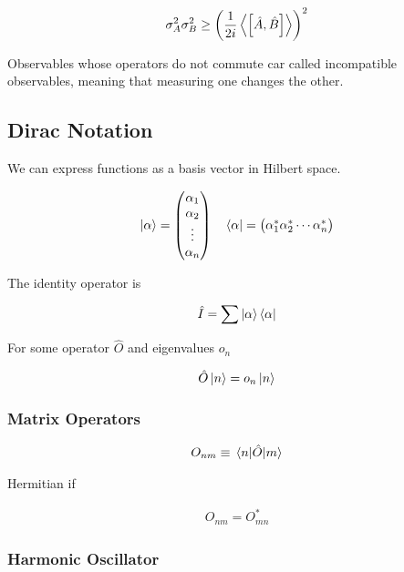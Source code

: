\documentclass[8pt]{amsart}
\begin{document}
\begin{multicols}{3}
\begin{align*}
  \sigma_A^2\sigma_B^2\geq {\left(\frac{1}{2i}\expval{\left[\hat{A},\hat{B}\right]}\right)}^2
\end{align*}

Observables whose operators do not commute car called incompatible observables,
meaning that measuring one changes the other.

\subsection{Dirac Notation}%
\label{sub:dirac_notation}

We can express functions as a basis vector in Hilbert space.

\begin{align*}
  \ket{\alpha}=\begin{pmatrix}
    \alpha_1\\
    \alpha_2\\
    \vdots \\
    \alpha_n
  \end{pmatrix}\quad
  \bra{\alpha}=\begin{pmatrix}
    \alpha_1^*  \alpha_2^*  \cdots  \alpha_n^*
  \end{pmatrix}
\end{align*}

The identity operator is

\begin{align*}
  \hat{I}=\sum\ket{\alpha}\bra{\alpha}
\end{align*}

For some operator $\hat{O}$ and eigenvalues $o_n$

\begin{align*}
  \hat{O}\ket{n}=o_n\ket{n}
\end{align*}

\subsubsection{Matrix Operators}%
\label{ssub:matrix_operators}

\begin{align*}
  O_{nm}\equiv\matrixel{n}{\hat{O}}{m}
\end{align*}

Hermitian if

\begin{align*}
  O_{nm}=O_{mn}^*
\end{align*}

\subsubsection{Harmonic Oscillator}%
\label{ssub:harmonic_oscillator}


\end{multicols}
\end{document}
